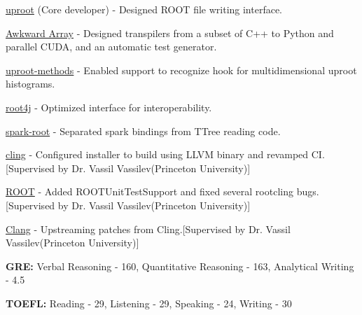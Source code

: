 \documentclass[10pt, letterpaper]{fulldeps}
\begin{document}
\begin{tightitemize}
\item {\href{https://github.com/scikit-hep/uproot}{uproot}} (Core developer) - Designed ROOT file writing interface.
\item {\href{https://github.com/scikit-hep/awkward-1.0}{Awkward Array}} - Designed transpilers from a subset of C++ to Python and parallel CUDA, and an automatic test generator.
\item {\href{https://github.com/scikit-hep/uproot-methods}{uproot-methods}} - Enabled support to recognize hook for multidimensional uproot histograms.
\item {\href{https://github.com/diana-hep/root4j}{root4j}} - Optimized interface for interoperability.
\item {\href{https://github.com/diana-hep/spark-root}{spark-root}} - Separated spark bindings from TTree reading code.
\item {\href{https://github.com/root-project/cling}{cling}} - Configured installer to build using LLVM binary and revamped CI.[Supervised by Dr. Vassil Vassilev(Princeton University)]
\item {\href{https://github.com/root-project/root}{ROOT}} - Added ROOTUnitTestSupport and fixed several rootcling bugs.[Supervised by Dr. Vassil Vassilev(Princeton University)]
\item {\href{https://clang.llvm.org/}{Clang}} - Upstreaming patches from Cling.[Supervised by Dr. Vassil Vassilev(Princeton University)]
\end{tightitemize}

\begin{tightitemize}
\item \textbf{GRE:} Verbal Reasoning - 160, Quantitative Reasoning - 163, Analytical Writing - 4.5
\item \textbf{TOEFL:} Reading - 29, Listening - 29, Speaking - 24, Writing - 30
\end{tightitemize}
\end{document}
